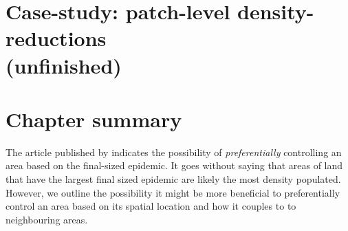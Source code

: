 \section{Case-study: patch-level density-reductions \\ (unfinished)}
\label{sec:cast-study-jump-patches}
\textcolor{red}{\blindtext}

\section{Chapter summary}

The article published by \cite{time-varying-infectivity} indicates the possibility of \textit{preferentially} controlling an area based on the final-sized epidemic. 
It goes without saying that areas of land that have the largest final sized epidemic are likely the most density populated. 
However, we outline the possibility it might be more beneficial to preferentially control an area based on its spatial location and how it couples to to neighbouring areas.







